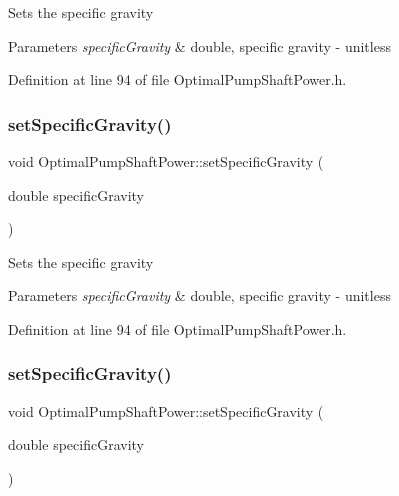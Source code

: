 Sets the specific gravity 
\begin{DoxyParams}{Parameters}
{\em specific\+Gravity} & double, specific gravity -\/ unitless \\
\hline
\end{DoxyParams}


Definition at line 94 of file Optimal\+Pump\+Shaft\+Power.\+h.

\mbox{\label{class_optimal_pump_shaft_power_aa565a332e4b144c8eb85fd06c541199e}} 
\subsubsection{\texorpdfstring{set\+Specific\+Gravity()}{setSpecificGravity()}\hspace{0.1cm}{\footnotesize\ttfamily [2/3]}}
{\footnotesize\ttfamily void Optimal\+Pump\+Shaft\+Power\+::set\+Specific\+Gravity (\begin{DoxyParamCaption}\item[{double}]{specific\+Gravity }\end{DoxyParamCaption})\hspace{0.3cm}{\ttfamily [inline]}}

Sets the specific gravity 
\begin{DoxyParams}{Parameters}
{\em specific\+Gravity} & double, specific gravity -\/ unitless \\
\hline
\end{DoxyParams}


Definition at line 94 of file Optimal\+Pump\+Shaft\+Power.\+h.

\mbox{\label{class_optimal_pump_shaft_power_aa565a332e4b144c8eb85fd06c541199e}} 
\subsubsection{\texorpdfstring{set\+Specific\+Gravity()}{setSpecificGravity()}\hspace{0.1cm}{\footnotesize\ttfamily [3/3]}}
{\footnotesize\ttfamily void Optimal\+Pump\+Shaft\+Power\+::set\+Specific\+Gravity (\begin{DoxyParamCaption}\item[{double}]{specific\+Gravity }\end{DoxyParamCaption})\hspace{0.3cm}{\ttfamily [inline]}}

